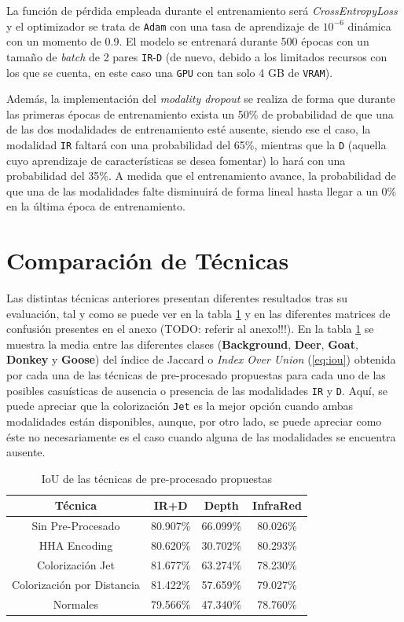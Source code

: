 \documentclass[12pt,a4paper]{report}
\begin{document}
La función de pérdida empleada durante el entrenamiento será \textit{CrossEntropyLoss} y el optimizador se trata de \texttt{Adam} con una tasa de aprendizaje de $10^{-6}$ dinámica con un momento de 0.9. El modelo se entrenará durante 500 épocas con un tamaño de \textit{batch} de 2 pares \texttt{IR}-\texttt{D} (de nuevo, debido a los limitados recursos con  los que se cuenta, en este caso una \texttt{GPU} con tan solo 4 GB de \texttt{VRAM}).

Además, la implementación del \textit{modality dropout} se realiza de forma que durante las primeras épocas de entrenamiento exista un 50\% de probabilidad de que una de las dos modalidades de entrenamiento esté ausente, siendo ese el caso, la modalidad \texttt{IR} faltará con una probabilidad del 65\%, mientras que la \texttt{D} (aquella cuyo aprendizaje de características se desea fomentar) lo hará con una probabilidad del 35\%. A medida que el entrenamiento avance, la probabilidad de que una de las modalidades falte disminuirá de forma lineal hasta llegar a un 0\% en la última época de entrenamiento.

\section{Comparación de Técnicas}
\label{subsec:cmx_techniques_comparison}
Las distintas técnicas anteriores presentan diferentes resultados tras su evaluación, tal y como se puede ver en la tabla \ref{tab:techniques_comparison} y en las diferentes matrices de confusión presentes en el anexo (TODO: referir al anexo!!!). En la tabla \ref{tab:techniques_comparison} se muestra la media entre las diferentes clases (\textbf{Background}, \textbf{Deer}, \textbf{Goat}, \textbf{Donkey} y \textbf{Goose}) del índice de Jaccard o \textit{Index Over Union} (\ref{eq:iou}) obtenida por cada una de las técnicas de pre-procesado propuestas para cada uno de las posibles casuísticas de ausencia o presencia de las modalidades \texttt{IR} y \texttt{D}. Aquí, se puede apreciar que la colorización \texttt{Jet} es la mejor opción cuando ambas modalidades están disponibles, aunque, por otro lado, se puede apreciar como éste no necesariamente es el caso cuando alguna de las modalidades se encuentra ausente.

\begin{table}[!h]
    \centering
    \begin{tabular}{|c|c|c|c|}
        \hline
        \textbf{Técnica} & \textbf{IR+D} & \textbf{Depth} & \textbf{InfraRed} \\
        \hline
        Sin Pre-Procesado & 80.907\% & 66.099\% & 80.026\% \\
        HHA Encoding & 80.620\% &  30.702\% &  80.293\%\\
        Colorización Jet & 81.677\% & 63.274\% & 78.230\%\\
        Colorización por Distancia & 81.422\% & 57.659\% & 79.027\%\\
        Normales & 79.566\% & 47.340\% & 78.760\%\\
        \hline
    \end{tabular}
    \caption{IoU de las técnicas de pre-procesado propuestas}
    \label{tab:techniques_comparison}
\end{table}
\end{document}
